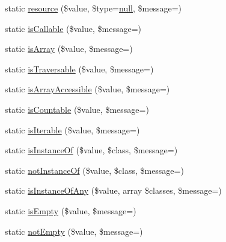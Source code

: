\begin{DoxyCompactItemize}
\item 
static \mbox{\hyperlink{class_webmozart_1_1_assert_1_1_assert_a0130c0a7e7b823e15f458b9dd442b6cf}{resource}} (\$value, \$type=\mbox{\hyperlink{class_webmozart_1_1_assert_1_1_assert_a3d8250bbe96b8687a49996b434805f6e}{null}}, \$message=\textquotesingle{}\textquotesingle{})
\item 
static \mbox{\hyperlink{class_webmozart_1_1_assert_1_1_assert_a474c66dd49577cf774dd5f40001fa2be}{is\+Callable}} (\$value, \$message=\textquotesingle{}\textquotesingle{})
\item 
static \mbox{\hyperlink{class_webmozart_1_1_assert_1_1_assert_a17ca296a4d6ea734af5ef47b51d5247c}{is\+Array}} (\$value, \$message=\textquotesingle{}\textquotesingle{})
\item 
static \mbox{\hyperlink{class_webmozart_1_1_assert_1_1_assert_a3c578fe4df71e6258b16f41ed3c8edc8}{is\+Traversable}} (\$value, \$message=\textquotesingle{}\textquotesingle{})
\item 
static \mbox{\hyperlink{class_webmozart_1_1_assert_1_1_assert_a10a0d3b37eda0e67086fdc6311a7a487}{is\+Array\+Accessible}} (\$value, \$message=\textquotesingle{}\textquotesingle{})
\item 
static \mbox{\hyperlink{class_webmozart_1_1_assert_1_1_assert_aea5b5d06dedaab2d0182a07681ddc947}{is\+Countable}} (\$value, \$message=\textquotesingle{}\textquotesingle{})
\item 
static \mbox{\hyperlink{class_webmozart_1_1_assert_1_1_assert_a9a3c3a7b05efbcc3a99edded7bd48931}{is\+Iterable}} (\$value, \$message=\textquotesingle{}\textquotesingle{})
\item 
static \mbox{\hyperlink{class_webmozart_1_1_assert_1_1_assert_a8419b0da7a722d61e2afb108b84f3c58}{is\+Instance\+Of}} (\$value, \$class, \$message=\textquotesingle{}\textquotesingle{})
\item 
static \mbox{\hyperlink{class_webmozart_1_1_assert_1_1_assert_a26aed0fba471354921cd560f37782dac}{not\+Instance\+Of}} (\$value, \$class, \$message=\textquotesingle{}\textquotesingle{})
\item 
static \mbox{\hyperlink{class_webmozart_1_1_assert_1_1_assert_a4da1149935a80305b7b7d5f67d41f8ea}{is\+Instance\+Of\+Any}} (\$value, array \$classes, \$message=\textquotesingle{}\textquotesingle{})
\item 
static \mbox{\hyperlink{class_webmozart_1_1_assert_1_1_assert_aaf4664738a231b2b4a358dfe932d946d}{is\+Empty}} (\$value, \$message=\textquotesingle{}\textquotesingle{})
\item 
static \mbox{\hyperlink{class_webmozart_1_1_assert_1_1_assert_a277ba4ae053d585b43bddbfaadb3b09e}{not\+Empty}} (\$value, \$message=\textquotesingle{}\textquotesingle{})

\end{DoxyCompactItemize}
